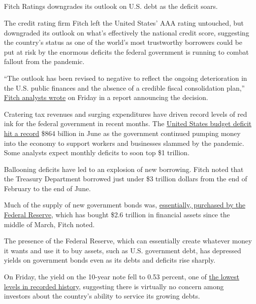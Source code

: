 \hypertarget{-6}{%
\subsection{}\label{-6}}

Fitch Ratings downgrades its outlook on U.S. debt as the deficit soars.

The credit rating firm Fitch left the United States' AAA rating
untouched, but downgraded its outlook on what's effectively the national
credit score, suggesting the country's status as one of the world's most
trustworthy borrowers could be put at risk by the enormous deficits the
federal government is running to combat fallout from the pandemic.

``The outlook has been revised to negative to reflect the ongoing
deterioration in the U.S. public finances and the absence of a credible
fiscal consolidation plan,''
\href{https://www.fitchratings.com/research/sovereigns/fitch-revises-united-states-outlook-to-negative-affirms-at-aaa-31-07-2020}{Fitch
analysts wrote} on Friday in a report announcing the decision.

Cratering tax revenues and surging expenditures have driven record
levels of red ink for the federal government in recent months. The
\href{https://www.nytimes.com/live/2020/07/13/business/stock-market-today-coronavirus\#the-us-budget-deficit-hits-another-monthly-record}{United
States budget deficit hit a record} \$864 billion in June as the
government continued pumping money into the economy to support workers
and businesses slammed by the pandemic. Some analysts expect monthly
deficits to soon top \$1 trillion.

Ballooning deficits have led to an explosion of new borrowing. Fitch
noted that the Treasury Department borrowed just under \$3 trillion
dollars from the end of February to the end of June.

Much of the supply of new government bonds was,
\href{https://www.nytimes.com/2020/04/15/business/coronavirus-stimulus-money.html}{essentially,
purchased by the Federal Reserve}, which has bought \$2.6 trillion in
financial assets since the middle of March, Fitch noted.

The presence of the Federal Reserve, which can essentially create
whatever money it wants and use it to buy assets, such as U.S.
government debt, has depressed yields on government bonds even as its
debts and deficits rise sharply.

On Friday, the yield on the 10-year note fell to 0.53 percent, one of
\href{https://www.marketwatch.com/story/10-year-treasury-yield-plunged-to-its-lowest-in-234-years-says-deutsche-bank-11596214464\#:~:text=The\%2010\%2Dyear\%20Treasury\%20note,scurrying\%20into\%20safe\%20haven\%20assets.}{the
lowest levels in recorded history}, suggesting there is virtually no
concern among investors about the country's ability to service its
growing debts.

